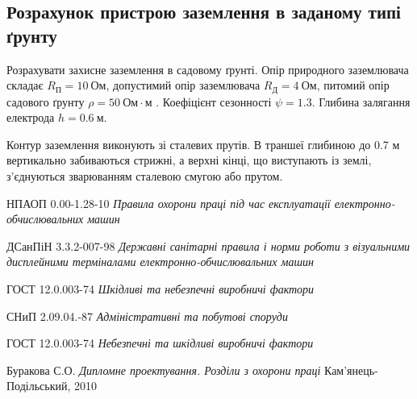 \documentclass[a4paper,12pt]{article}
\begin{document}
\subsection{Розрахунок пристрою заземлення в заданому типі ґрунту}
Розрахувати захисне заземлення в садовому ґрунті. Опір природного заземлювача складає $R_\text{П}=10\ \text{Ом}$, допустимий опір заземлювача $R_\text{Д}=4\ \text{Ом}$, питомий опір садового ґрунту $\rho=50\ \text{Ом}\cdot\text{м}$ \cite{burakova}. Коефіцієнт сезонності $\psi = 1.3$. Глибина залягання електрода $h = 0.6\ \text{м}$.

Контур заземлення виконують зі сталевих прутів. В траншеї глибиною до 0.7 м вертикально забиваються стрижні, а верхні кінці, що виступають із землі, з’єднуються зварюванням сталевою смугою або прутом.





\begin{thebibliography}{9}
	НПАОП 0.00-1.28-10
	\emph{Правила охорони праці під час експлуатації електронно-обчислювальних машин}
	
	ДСанПіН  3.3.2-007-98
	\emph{Державні санітарні правила і норми роботи з візуальними дисплейними терміналами електронно-обчислювальних машин}
	
	ГОСТ 12.0.003-74
	\emph{Шкідливі та небезпечні виробничі фактори}
	
	СНиП 2.09.04.-87
	\emph{Адміністративні та побутові споруди}
	
	ГОСТ 12.0.003-74
	\emph{Небезпечні та шкідливі виробничі фактори}
	
	Буракова С.О.
	\emph{Дипломне проектування. Розділи з охорони праці}
	Кам’янець-Подільський, 2010

\end{thebibliography}
\end{document}
